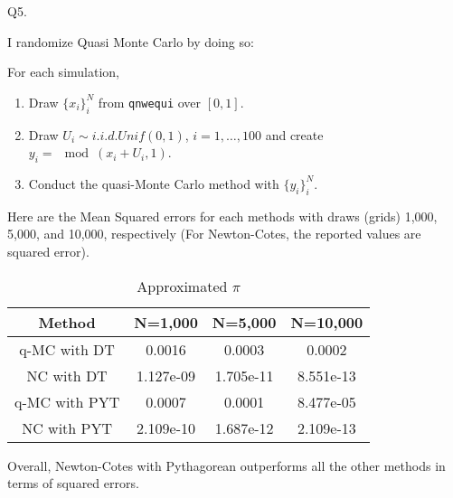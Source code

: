 \documentclass[10pt, letterpaper]{article}
\begin{document}
\noindent Q5. 

\noindent I randomize Quasi Monte Carlo by doing so:

For each simulation, 
\begin{enumerate}
\item Draw $\{x_{i}\}_{i}^{N}$ from \texttt{qnwequi}
 over $[0,1]$.
\item Draw $U_{i} \sim i.i.d. Unif(0,1)$, $i=1,\hdots,100$ and create $y_{i} = \mod(x_{i}+U_{i},1)$.
\item Conduct the quasi-Monte Carlo method with $\{ y_{i} \}_{i}^{N}$.  
\end{enumerate}

Here are the Mean Squared errors for each methods with draws (grids) 1,000, 5,000, and 10,000, respectively (For Newton-Cotes, the reported values are squared error).

\begin{table}[h!]
  \begin{center}
    \caption{Approximated $\pi$}  
    \label{tab:estimate}
    \begin{tabular}{c|c|c|c} %
      \hline\hline
       Method                & N=1,000         &  N=5,000       &  N=10,000  \\
      \hline
       q-MC with DT          & 0.0016           &  0.0003       &  0.0002     \\
       NC with DT            & 1.127e-09        &  1.705e-11    &  8.551e-13    \\ 
       q-MC with PYT         & 0.0007           &  0.0001       &  8.477e-05  \\
       NC with PYT           & 2.109e-10        &  1.687e-12    &  2.109e-13 \\ 
      \hline      \hline
    \end{tabular}
  \end{center}
\end{table} 

Overall, Newton-Cotes with Pythagorean outperforms all the other methods in terms of squared errors. 
\clearpage
\end{document}
